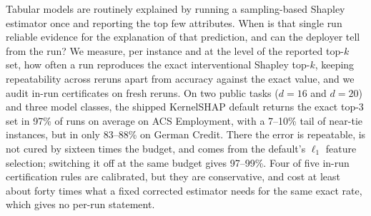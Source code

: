 Tabular models are routinely explained by running a sampling-based Shapley estimator once and reporting the top few attributes. When is that single run reliable evidence for the explanation of that prediction, and can the deployer tell from the run? We measure, per instance and at the level of the reported top-$k$ set, how often a run reproduces the exact interventional Shapley top-$k$, keeping repeatability across reruns apart from accuracy against the exact value, and we audit in-run certificates on fresh reruns. On two public tasks ($d=16$ and $d=20$) and three model classes, the shipped KernelSHAP default returns the exact top-3 set in 97\% of runs on average on ACS Employment, with a 7--10\% tail of near-tie instances, but in only 83--88\% on German Credit. There the error is repeatable, is not cured by sixteen times the budget, and comes from the default's $\ell_1$ feature selection; switching it off at the same budget gives 97--99\%. Four of five in-run certification rules are calibrated, but they are conservative, and cost at least about forty times what a fixed corrected estimator needs for the same exact rate, which gives no per-run statement.
